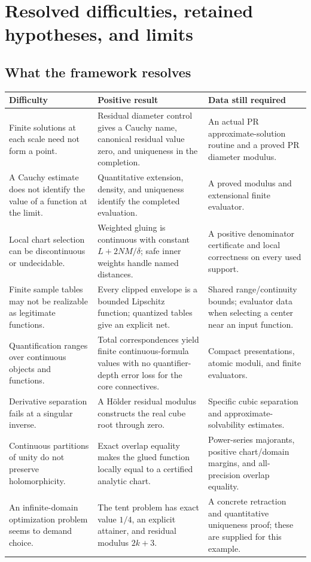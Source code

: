 \section{Resolved difficulties, retained hypotheses, and limits}\label{sec:limits}

\subsection{What the framework resolves}

\begin{longtable}{@{}P{.25\textwidth}P{.35\textwidth}P{.32\textwidth}@{}}
\toprule Difficulty & Positive result & Data still required\\\midrule\endhead
Finite solutions at each scale need not form a point. & Residual diameter control gives a Cauchy name, canonical residual value zero, and uniqueness in the completion. & An actual PR approximate-solution routine and a proved PR diameter modulus.\\
A Cauchy estimate does not identify the value of a function at the limit. & Quantitative extension, density, and uniqueness identify the completed evaluation. & A proved modulus and extensional finite evaluator.\\
Local chart selection can be discontinuous or undecidable. & Weighted gluing is continuous with constant \(L+2NM/\delta\); safe inner weights handle named distances. & A positive denominator certificate and local correctness on every used support.\\
Finite sample tables may not be realizable as legitimate functions. & Every clipped envelope is a bounded Lipschitz function; quantized tables give an explicit net. & Shared range/continuity bounds; evaluator data when selecting a center near an input function.\\
Quantification ranges over continuous objects and functions. & Total correspondences yield finite continuous-formula values with no quantifier-depth error loss for the core connectives. & Compact presentations, atomic moduli, and finite evaluators.\\
Derivative separation fails at a singular inverse. & A H\"older residual modulus constructs the real cube root through zero. & Specific cubic separation and approximate-solvability estimates.\\
Continuous partitions of unity do not preserve holomorphicity. & Exact overlap equality makes the glued function locally equal to a certified analytic chart. & Power-series majorants, positive chart/domain margins, and all-precision overlap equality.\\
An infinite-domain optimization problem seems to demand choice. & The tent problem has exact value \(1/4\), an explicit attainer, and residual modulus \(2k+3\). & A concrete retraction and quantitative uniqueness proof; these are supplied for this example.\\
\bottomrule
\end{longtable}

